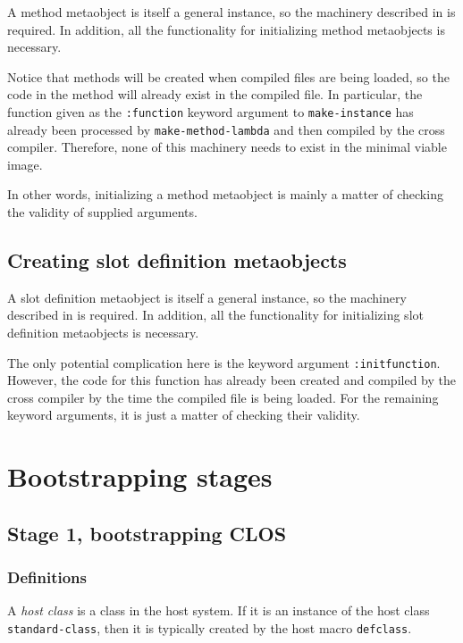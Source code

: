 A method metaobject is itself a general instance, so the machinery
described in  is
required.  In addition, all the functionality for initializing method
metaobjects is necessary.

Notice that methods will be created when compiled files are being
loaded, so the code in the method will already exist in the compiled
file.  In particular, the function given as the \texttt{:function}
keyword argument to \texttt{make-instance} has already been processed
by \texttt{make-method-lambda} and then compiled by the cross
compiler.  Therefore, none of this machinery needs to exist in the
minimal viable image.

In other words, initializing a method metaobject is mainly a matter of
checking the validity of supplied arguments.

\subsection{Creating slot definition metaobjects}

A slot definition metaobject is itself a general instance, so the
machinery described in
 is required.  In
addition, all the functionality for initializing slot definition
metaobjects is necessary.

The only potential complication here is the keyword argument
\texttt{:initfunction}.  However, the code for this function has
already been created and compiled by the cross compiler by the time
the compiled file is being loaded.  For the remaining keyword
arguments, it is just a matter of checking their validity.

\section{Bootstrapping stages}

\subsection{Stage 1, bootstrapping CLOS}

\subsubsection{Definitions}

\begin{definition}
A \emph{host class} is a class in the host system.  If it is an
instance of the host class \texttt{standard-class}, then it is
typically created by the host macro \texttt{defclass}.
\end{definition}

